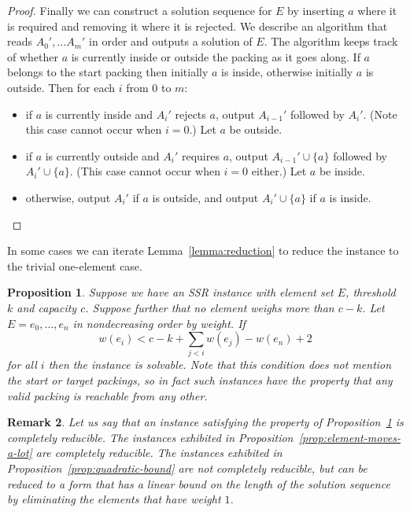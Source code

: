 \documentclass{robinminion}
\newtheorem{prop}{Proposition}
\newtheorem{rem}[prop]{Remark}
\let\union\cup
\begin{document}
\begin{proof}
    Finally we can construct a solution sequence for $E$ by inserting $a$ where it is required and removing it where it is rejected. We describe an algorithm that reads $A_0', \dots A_m'$ in order and outputs a solution of $E$. The algorithm keeps track of whether $a$ is currently inside or outside the packing as it goes along. If $a$ belongs to the start packing then initially $a$ is inside, otherwise initially $a$ is outside. Then for each $i$ from $0$ to $m$:
    \begin{itemize}
        \item if $a$ is currently inside and $A_i'$ rejects $a$, output $A_{i-1}'$ followed by $A_i'$. (Note this case cannot occur when $i=0$.) Let $a$ be outside.
        \item if $a$ is currently outside and $A_i'$ requires $a$, output $A_{i-1}'\union\{a\}$ followed by $A_i'\union\{a\}$. (This case cannot occur when $i=0$ either.) Let $a$ be inside.
        \item otherwise, output $A_i'$ if $a$ is outside, and output $A_i'\union\{a\}$ if $a$ is inside.
    \end{itemize}
\end{proof}

\noindent In some cases we can iterate Lemma~\ref{lemma:reduction} to reduce the instance to the trivial one-element case.
\begin{prop}\label{prop:iterated-reduction}
    Suppose we have an SSR instance with element set $E$, threshold $k$ and capacity $c$. Suppose further that no element weighs more than $c-k$. Let $E = {e_0, \dots, e_n}$ in nondecreasing order by weight. If
    \[
        w(e_i) < c - k + \sum_{j<i}w(e_j) - w(e_n) + 2
    \]
    for all $i$ then the instance is solvable. Note that this condition does not mention the start or target packings, so in fact such instances have the property that any valid packing is reachable from any other.
\end{prop}
\begin{rem}
    Let us say that an instance satisfying the property of Proposition~\ref{prop:iterated-reduction} is \textit{completely reducible}. The instances exhibited in Proposition~\ref{prop:element-moves-a-lot} are completely reducible. The instances exhibited in Proposition~\ref{prop:quadratic-bound} are not completely reducible, but can be reduced to a form that has a linear bound on the length of the solution sequence by eliminating the elements that have weight $1$.
\end{rem}
\end{document}
